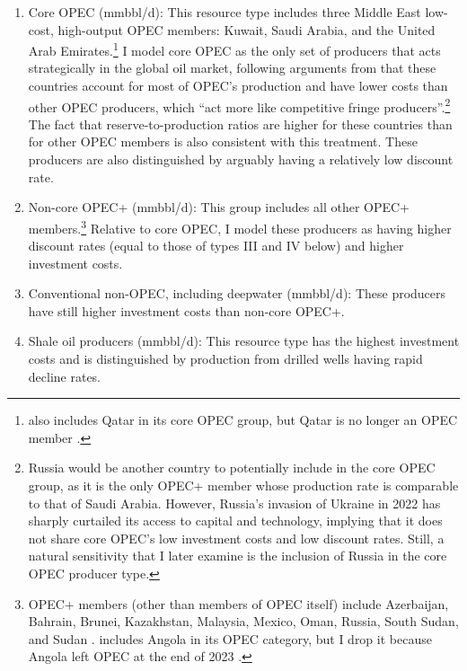 \documentclass[12pt]{article}
\begin{document}
\begin{enumerate}[label=\Roman*.]
\item Core OPEC (mmbbl/d): This resource type includes three Middle East low-cost, high-output OPEC members: Kuwait, Saudi Arabia, and the United Arab Emirates.\footnote{\cite{balkejinyucel2024} also includes Qatar in its core OPEC group, but Qatar is no longer an OPEC member \citep{EnergyInstitute2024}.} I model core OPEC as the only set of producers that acts strategically in the global oil market, following arguments from \cite{balkejinyucel2024} that these countries account for most of OPEC's production and have lower costs than other OPEC producers, which ``act more like competitive fringe producers''.\footnote{Russia would be another country to potentially include in the core OPEC group, as it is the only OPEC+ member whose production rate is comparable to that of Saudi Arabia. However, Russia's invasion of Ukraine in 2022 has sharply curtailed its access to capital and technology, implying that it does not share core OPEC's low investment costs and low discount rates. Still, a natural sensitivity that I later examine is the inclusion of Russia in the core OPEC producer type.} The fact that reserve-to-production ratios are higher for these countries than for other OPEC members \citep{rystadreserves2023} is also consistent with this treatment. These producers are also distinguished by arguably having a relatively low discount rate.
\item Non-core OPEC+ (mmbbl/d): This group includes all other OPEC+ members.\footnote{OPEC+ members (other than members of OPEC itself) include Azerbaijan, Bahrain, Brunei, Kazakhstan, Malaysia, Mexico, Oman, Russia, South Sudan, and Sudan \citep{eiaopec2023}. \cite{EnergyInstitute2024} includes Angola in its OPEC category, but I drop it because Angola left OPEC at the end of 2023 \citep{nytangola}.} Relative to core OPEC, I model these producers as having higher discount rates (equal to those of types III and IV below) and higher investment costs.
\item Conventional non-OPEC, including deepwater (mmbbl/d): These producers have still higher investment costs than non-core OPEC+.
\item Shale oil producers (mmbbl/d): This resource type has the highest investment costs and is distinguished by production from drilled wells having rapid decline rates.
\end{enumerate}
\end{document}
